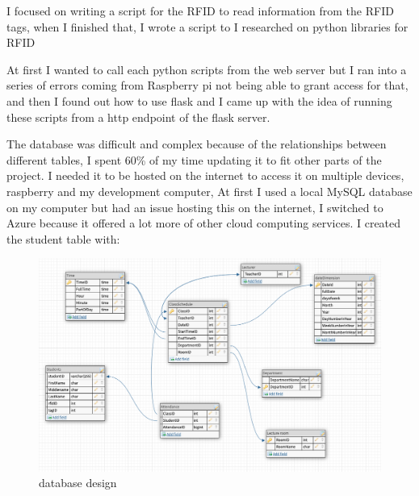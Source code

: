 I focused on writing a script for the RFID to read information from the RFID tags, when I finished that, I wrote a script to 
I researched on python libraries for RFID 


At first I wanted to call each python scripts from the web server but I ran into a series of errors coming from Raspberry pi not being able to grant access for that, and then I found out how to use flask and I came up with the idea of running these scripts from a http endpoint of the flask server.

The database was difficult and complex because of the relationships between different tables, I spent 60\% of my time updating it to fit other parts of the project. I needed it to be hosted on the internet to access it on multiple devices, raspberry and my development computer, At first I used a local MySQL database on my computer but had an issue hosting this on the internet, I switched to Azure because it offered a lot more of other cloud computing services. I created the student table with:

\begin{figure}[ht]
  \includegraphics[scale=0.4]{Design & Implementation/images/database_design.png}
  \caption{database design}
\end{figure}

